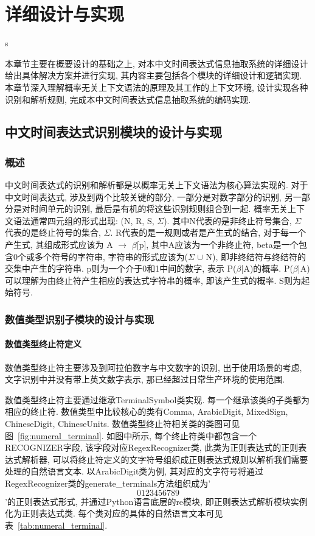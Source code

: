 
\chapter{详细设计与实现}s

本章节主要在概要设计的基础之上, 对本中文时间表达式信息抽取系统的详细设计给出具体解决方案并进行实现, 其内容主要包括各个模块的详细设计和逻辑实现.
本章节深入理解概率无关上下文语法的原理及其工作的上下文环境, 设计实现各种识别和解析规则, 完成本中文时间表达式信息抽取系统的编码实现.


\section{中文时间表达式识别模块的设计与实现}

\subsection{概述}

中文时间表达式的识别和解析都是以概率无关上下文语法为核心算法实现的.
对于中文时间表达式, 涉及到两个比较关键的部分, 一部分是对数字部分的识别, 另一部分是对时间单元的识别, 最后是有机的将这些识别规则组合到一起.
概率无关上下文语法通常四元组的形式出现: (N, R, S,  $\varSigma$). 其中N代表的是非终止符号集合, $\varSigma$ 代表的是终止符号的集合, $\varSigma$.
R代表的是一规则或者是产生式的结合, 对于每一个产生式, 其组成形式应该为 A $\rightarrow$ $\beta$[p], 其中A应该为一个非终止符, beta是一个包含0个或多个符号的字符串,
字符串的形式应该为($\varSigma$ $\cup$ N), 即非终结符与终结符的交集中产生的字符串. p则为一个介于0和1中间的数字, 表示 P($\beta$|A)的概率.
P($\beta$|A)可以理解为由终止符产生相应的表达式字符串的概率, 即该产生式的概率.
S则为起始符号.


\subsection{数值类型识别子模块的设计与实现}

\subsubsection{数值类型终止符定义}

数值类型终止符主要涉及到阿拉伯数字与中文数字的识别, 出于使用场景的考虑, 文字识别中并没有带上英文数字表示, 那已经超过日常生产环境的使用范围.

数值类型终止符主要通过继承TerminalSymbol类实现. 每一个继承该类的子类都为相应的终止符. 数值类型中比较核心的类有Comma, ArabicDigit, MixedSign, ChineseDigit, ChineseUnits. 
数值类型终止符相关类的类图可见图~\ref{fig:numeral_terminal}. 
如图中所示, 每个终止符类中都包含一个RECOGNIZER字段, 该字段对应RegexRecognizer类, 此类为正则表达式的正则表达式解析器, 可以将终止符定义的文字符号组织成正则表达式规则以解析我们需要处理的自然语言文本.
以ArabicDigit类为例, 其对应的文字符号将通过RegexRecognizer类的generate\_terminals方法组织成为'\[0123456789\]'的正则表达式形式, 并通过Python语言底层的re模块, 即正则表达式解析模块实例化为正则表达式类.
每个类对应的具体的自然语言文本可见表~\ref{tab:numeral_terminal}.

